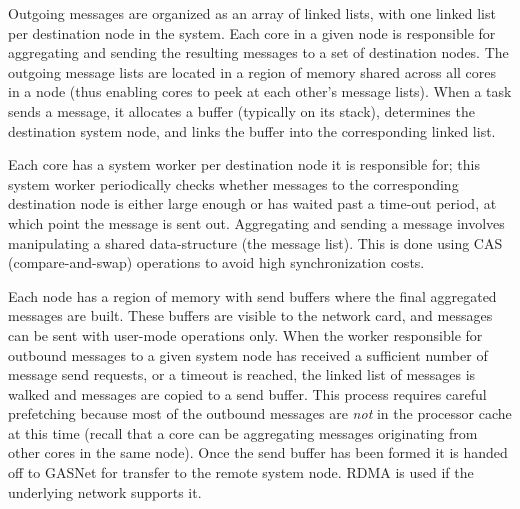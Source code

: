 Outgoing messages are organized as an array of linked lists, with one linked
list per destination node in the system. Each core in a given node is
responsible for aggregating and sending the resulting messages to a set of
destination nodes. The outgoing message lists are located in a region of
memory shared across all cores in a \Grappa node (thus enabling cores to peek
at each other's message lists). When a task sends a message, it allocates a buffer (typically on its stack),  determines the destination system
node, and links the buffer into the corresponding linked list.

Each core has a system worker per destination node it is responsible for; this
system worker periodically checks whether messages to the corresponding
destination node is either large enough or has waited past a time-out period,
at which point the message is sent out. Aggregating and sending a message
involves manipulating a shared data-structure (the message list). This is done
using CAS (compare-and-swap) operations to avoid high synchronization costs. 


Each node has a region of memory with send buffers where the final aggregated
messages are built. These buffers are visible to the network card, and
messages can be sent with user-mode operations only. When the worker
responsible for outbound messages to a given system node has received a
sufficient number of message send requests, or a timeout is reached, the
linked list of messages is walked and messages are copied to a send buffer.
This process requires careful prefetching because most of the outbound
messages are \emph{not} in the processor cache at this time (recall that a
core can be aggregating messages originating from other cores in the same
node). Once the send buffer has been formed it is handed off to GASNet for
transfer to the remote system node. RDMA is used if the underlying network
supports it. 

